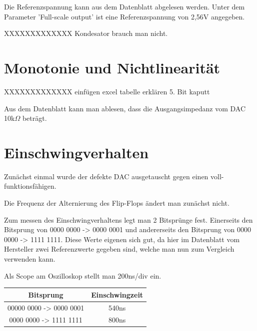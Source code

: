 Die Referenzspannung kann aus dem Datenblatt abgelesen werden. Unter dem 
Parameter 'Full-scale output' ist eine Referenzspannung von 2,56V angegeben.

XXXXXXXXXXXXX Kondesator brauch man nicht.

\section{Monotonie und Nichtlinearität}
XXXXXXXXXXXXX 
einfügen excel tabelle
erklären 5. Bit kaputt


Aus dem Datenblatt kann man ablesen, dass die Ausgangsimpedanz vom
DAC 10k$\Omega$ beträgt.



\section{Einschwingverhalten}

Zunächst einmal wurde der defekte DAC ausgetauscht 
gegen einen voll-funktionsfähigen. \newline

Die Frequenz der Alternierung des Flip-Flops ändert man zunächst nicht. \newline

Zum messen des Einschwingverhaltens legt man 2 Bitsprünge fest.
Einerseits den Bitsprung von 0000 0000 -> 0000 0001 und andererseits 
den Bitsprung von 0000 0000 -> 1111 1111.
Diese Werte eigenen sich gut, da hier im Datenblatt vom Hersteller 
zwei Referenzwerte gegeben sind, welche man nun zum Vergleich verwenden kann.\newline

Als Scope am Oszilloskop stellt man 200ns/div ein. \newline


\begin{tabular}[h]{c|c}
    Bitsprung & Einschwingzeit \\
    \hline
    00000 0000 -> 0000 0001 & 540ns\\
    \hline
    0000 0000 -> 1111 1111 & 800ns \\

\end{tabular}

